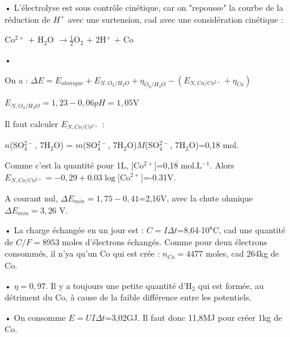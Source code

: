 \documentclass{report}
\begin{document}
\begin{itemize}
	 \item[•] L'électrolyse est sous contrôle cinétique, car on "repousse" la courbe de la réduction de $H^+$ avec une surtension, cad avec une considération cinétique : 
	 
	 Co$^{2+}$ + H$_2$O $\longrightarrow\frac{1}{2}$O$_2$ + 2H$^+$ + Co
	 \item[•] 
	 
	 On a : $\Delta E = E_{ohmique} + E_{N, O_2/H_2O} + \eta_{O_2/H_2O} - ( E_{N,Co/Co^{2+}} + \eta_{Co})$
	 
	$E_{N, O_2/H_2O}=1,23-0,06pH=1,05$V
	 
	 Il faut calculer $E_{N,Co/Co^{2+}}$ :
	 
	 $n$(SO$_{4}^{2-}$, 7H$_2$O) = $m$(SO$_{4}^{2-}$, 7H$_2$O)$M$(SO$_{4}^{2-}$, 7H$_2$O)=0,18 mol.
	 
	 Comme c'est la quantité pour 1L, [Co$^{2+}$]=0,18 mol.L$^{-1}$. Alors $E_{N,Co/Co^{2+}}=-0,29+0.03\log$[Co$^{2+}$]=-0.31V.
	 
	  A courant nul, $\Delta E_{min}=1,75-0,41$=2,16V, avec la chute ohmique $\Delta E_{min}=3,26$ V.
	  
	  \item[•] La charge échangée en un jour est : $C=I\Delta t$=8,64$\cdot$10$^8$C, cad une quantité de $C/F=8953$ moles d'électrons échangés. Comme pour deux électrons consommés, il n'ya qu'un Co qui est crée :
	  $n_{Co}=4477$ moles, cad 264kg de Co.
	  \item[•] $\eta=0,97$. Il y a toujours une petite quantité d'H$_2$ qui est formée, au détriment du Co, à cause de la faible différence entre les potentiels.
	  \item[•] On consomme $E= UI\Delta t$=3,02GJ. Il faut donc 11,8MJ pour créer 1kg de Co.
\end{itemize}
\end{document}
